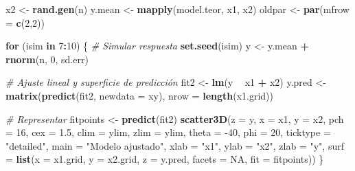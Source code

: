 \documentclass[
  spanish,
]{book}
\newenvironment{Shaded}{\begin{snugshade}}{\end{snugshade}}
\newcommand{\CommentTok}[1]{\textcolor[rgb]{0.56,0.35,0.01}{\textit{#1}}}
\newcommand{\ControlFlowTok}[1]{\textcolor[rgb]{0.13,0.29,0.53}{\textbf{#1}}}
\newcommand{\DataTypeTok}[1]{\textcolor[rgb]{0.13,0.29,0.53}{#1}}
\newcommand{\DecValTok}[1]{\textcolor[rgb]{0.00,0.00,0.81}{#1}}
\newcommand{\FloatTok}[1]{\textcolor[rgb]{0.00,0.00,0.81}{#1}}
\newcommand{\KeywordTok}[1]{\textcolor[rgb]{0.13,0.29,0.53}{\textbf{#1}}}
\newcommand{\NormalTok}[1]{#1}
\newcommand{\OperatorTok}[1]{\textcolor[rgb]{0.81,0.36,0.00}{\textbf{#1}}}
\newcommand{\OtherTok}[1]{\textcolor[rgb]{0.56,0.35,0.01}{#1}}
\newcommand{\StringTok}[1]{\textcolor[rgb]{0.31,0.60,0.02}{#1}}
\theoremstyle{break}
\theoremstyle{definition}
\theoremstyle{definition}
\theoremstyle{definition}
\theoremstyle{remark}
\begin{document}
\begin{Shaded}
\begin{Highlighting}[]
\NormalTok{x2 <-}\StringTok{ }\KeywordTok{rand.gen}\NormalTok{(n)}
\NormalTok{y.mean <-}\StringTok{ }\KeywordTok{mapply}\NormalTok{(model.teor, x1, x2)}
\NormalTok{oldpar <-}\StringTok{ }\KeywordTok{par}\NormalTok{(}\DataTypeTok{mfrow =} \KeywordTok{c}\NormalTok{(}\DecValTok{2}\NormalTok{,}\DecValTok{2}\NormalTok{))}

\ControlFlowTok{for}\NormalTok{ (isim }\ControlFlowTok{in} \DecValTok{7}\OperatorTok{:}\DecValTok{10}\NormalTok{) \{}
  \CommentTok{# Simular respuesta}
  \KeywordTok{set.seed}\NormalTok{(isim)}
\NormalTok{  y <-}\StringTok{ }\NormalTok{y.mean }\OperatorTok{+}\StringTok{ }\KeywordTok{rnorm}\NormalTok{(n, }\DecValTok{0}\NormalTok{, sd.err)}
  
  \CommentTok{# Ajuste lineal y superficie de predicción}
\NormalTok{  fit2 <-}\StringTok{ }\KeywordTok{lm}\NormalTok{(y }\OperatorTok{~}\StringTok{ }\NormalTok{x1 }\OperatorTok{+}\StringTok{ }\NormalTok{x2)}
\NormalTok{  y.pred <-}\StringTok{ }\KeywordTok{matrix}\NormalTok{(}\KeywordTok{predict}\NormalTok{(fit2, }\DataTypeTok{newdata =}\NormalTok{ xy), }\DataTypeTok{nrow =} \KeywordTok{length}\NormalTok{(x1.grid)) }
  
  \CommentTok{# Representar}
\NormalTok{  fitpoints <-}\StringTok{ }\KeywordTok{predict}\NormalTok{(fit2) }
  \KeywordTok{scatter3D}\NormalTok{(}\DataTypeTok{z =}\NormalTok{ y, }\DataTypeTok{x =}\NormalTok{ x1, }\DataTypeTok{y =}\NormalTok{ x2, }\DataTypeTok{pch =} \DecValTok{16}\NormalTok{, }\DataTypeTok{cex =} \FloatTok{1.5}\NormalTok{, }\DataTypeTok{clim =}\NormalTok{ ylim, }\DataTypeTok{zlim =}\NormalTok{ ylim,}
            \DataTypeTok{theta =} \DecValTok{-40}\NormalTok{, }\DataTypeTok{phi =} \DecValTok{20}\NormalTok{, }\DataTypeTok{ticktype =} \StringTok{"detailed"}\NormalTok{, }
            \DataTypeTok{main =} \StringTok{"Modelo ajustado"}\NormalTok{, }\DataTypeTok{xlab =} \StringTok{"x1"}\NormalTok{, }\DataTypeTok{ylab =} \StringTok{"x2"}\NormalTok{, }\DataTypeTok{zlab =} \StringTok{"y"}\NormalTok{, }
            \DataTypeTok{surf =} \KeywordTok{list}\NormalTok{(}\DataTypeTok{x =}\NormalTok{ x1.grid, }\DataTypeTok{y =}\NormalTok{ x2.grid, }\DataTypeTok{z =}\NormalTok{ y.pred, }
                        \DataTypeTok{facets =} \OtherTok{NA}\NormalTok{, }\DataTypeTok{fit =}\NormalTok{ fitpoints))}
\NormalTok{\}}
\end{Highlighting}
\end{Shaded}
\end{document}
